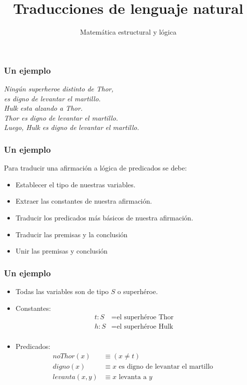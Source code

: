 \documentclass{beamer}
\title{Traducciones de lenguaje natural}
\author{Matemática estructural y lógica}
\institute{ISIS-1104}
\date{}
\begin{document}
\frame{\titlepage}

\begin{frame}[fragile]
    \frametitle{Un ejemplo}
    \begin{center}
        \textit{Ningún superheroe distinto de Thor, \\
        es digno de levantar el martillo. \\
        Hulk esta alzando a Thor. \\
        Thor es digno de levantar el martillo. \\
        Luego, Hulk es digno de levantar el martillo.}
    \end{center}
\end{frame}

\begin{frame}[fragile]
    \frametitle{Un ejemplo}
    Para traducir una afirmación a lógica de predicados se debe:
    \begin{itemize}
        \item Establecer el tipo de nuestras variables.
        \item Extraer las constantes de nuestra afirmación.
        \item Traducir los predicados más básicos de nuestra afirmación.
        \item Traducir las premisas y la conclusión
        \item Unir las premisas y conclusión
    \end{itemize}
\end{frame}

\begin{frame}[fragile]
    \frametitle{Un ejemplo}
    \begin{itemize}
        \item Todas las variables son de tipo $S$ o superhéroe.
        \item Constantes:
            \begin{align*}
                t : S &= \text{el superhéroe Thor} \\
                h : S &= \text{el superhéroe Hulk} \\
            \end{align*}
        \item Predicados:
            \begin{align*}
                noThor(x) &\equiv (x \neq t) \\
                digno(x) &\equiv x\text{ es digno de levantar el martillo } \\
                levanta(x, y) &\equiv x\text{ levanta a }y \\
            \end{align*}
    \end{itemize}
\end{frame}
\end{document}
